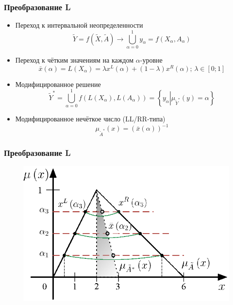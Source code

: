 \documentclass[12pt]{beamer}
\begin{document}
\begin{frame}
  \frametitle{Преобразование L}
  \begin{itemize}
    \item Переход к интервальной неопределенности
      \begin{equation}
        \label{eq:task-transform}
      	\tilde{Y} = f\left( \tilde X, \tilde A \right)\to \bigcup\limits_{\alpha =0}^{1}{y_\alpha}=f\left( X_\alpha, A_\alpha \right)
      \end{equation}
    \item Переход к чётким значениям на каждом $\alpha$-уровне 
      \begin{equation}
        \label{eq:L-transform-base}
        \bar{x}\left( \alpha  \right)=L\left( X_\alpha \right)=\lambda x^L \left( \alpha  \right)+\left( 1-\lambda  \right) x^R \left( \alpha  \right);\, \lambda \in \left[0; 1 \right]
      \end{equation}
    \item Модифицированное решение
      \begin{equation}
        \tilde Y^{*}= \bigcup\limits_{\alpha =0}^{1} f\left(L\left( X_\alpha \right), L\left( A_\alpha \right) \right)=\left\{ y_\alpha \left| \mu_{\tilde Y^*}(y)=\alpha \right. \right\}
      \end{equation}
    \item Модифицированное нечёткое число (LL/RR-типа)
      \begin{equation}
        \label{eq:modified-number}
        \mu_{\tilde A^{*}}\left( x \right)={\left( \bar{x}\left( \alpha  \right) \right)}^{-1}
      \end{equation}
  \end{itemize}
\end{frame}


\begin{frame}
  \frametitle{Преобразование L}
  \begin{figure}
    \center
    \includegraphics[width=\textwidth]{l-transform-full}
  \end{figure}
\end{frame}
\end{document}

